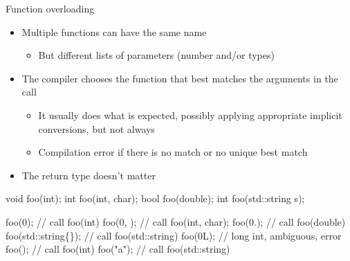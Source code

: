 \begin{frame}[fragile]{Function overloading}

  \begin{itemize}
  \item Multiple functions can have the same name
    \begin{itemize}
    \item But different lists of parameters (number and/or types)
    \end{itemize}
  \item The compiler chooses the function that best matches the arguments in
    the call
    \begin{itemize}
    \item It usually does what is expected, possibly applying appropriate
      implicit conversions, but not always
    \item Compilation error if there is no match or no unique best match
    \end{itemize}
  \item The return type doesn't matter
  \end{itemize}

  \begin{codeblock}
void foo(int);
int  foo(int, char);
bool foo(double);
int  foo(std::string s);

foo(0);             // call foo(int)
foo(0, );        // call foo(int, char);
foo(0.);            // call foo(double)
foo(std::string\{\}); // call foo(std::string)
foo(0L);            // long int, ambiguous, error
foo();           // call foo(int)
foo("a");           // call foo(std::string)\end{codeblock}

\end{frame}

